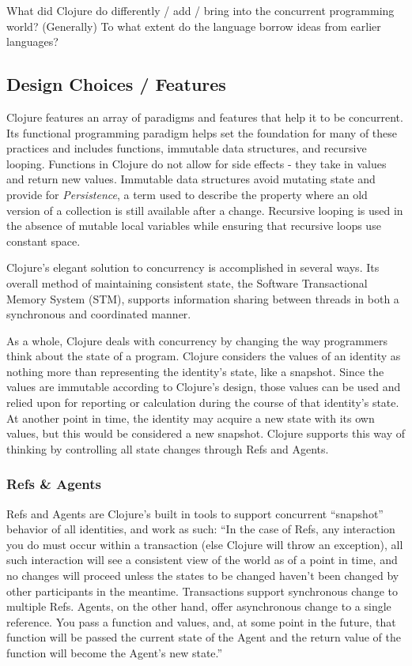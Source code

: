    What did Clojure do differently / add / bring into the concurrent programming world? (Generally) \cite{website:clojure-lang-reference}
    To what extent do the language borrow ideas from earlier languages?
    
\subsection{Design Choices / Features}
    
   Clojure features an array of paradigms and features that help it to be concurrent. Its functional programming paradigm helps set the foundation for many of these practices and includes functions, immutable data structures, and recursive looping. Functions in Clojure do not allow for side effects - they take in values and return new values. Immutable data structures avoid mutating state and provide for \textit{Persistence}, a term used to describe the property where an old version of a collection is still available after a change. Recursive looping is used in the absence of mutable local variables while ensuring that recursive loops use constant space.
    
    Clojure's elegant solution to concurrency is accomplished in several ways. Its overall method of maintaining consistent state, the Software Transactional Memory System (STM), supports information sharing between threads in both  a synchronous and coordinated manner.
    
    As a whole, Clojure deals with concurrency by changing the way programmers think about the state of a program. Clojure considers the values of an identity as nothing more than representing the identity's state, like a snapshot. Since the values are immutable according to Clojure's design, those values can be used and relied upon for reporting or calculation during the course of that identity's state. At another point in time, the identity may acquire a new state with its own values, but this would be considered a new snapshot. Clojure supports this way of thinking by controlling all state changes through Refs and Agents.

\subsubsection{Refs \& Agents}

    Refs and Agents are Clojure's built in tools to support concurrent ``snapshot'' behavior of all identities, and work as such: ``In the case of Refs, any interaction you do must occur within a transaction (else Clojure will throw an exception), all such interaction will see a consistent view of the world as of a point in time, and no changes will proceed unless the states to be changed haven’t been changed by other participants in the meantime. Transactions support synchronous change to multiple Refs. Agents, on the other hand, offer asynchronous change to a single reference. You pass a function and values, and, at some point in the future, that function will be passed the current state of the Agent and the return value of the function will become the Agent’s new state.'' \cite{website:clojure-concurrency}
    
